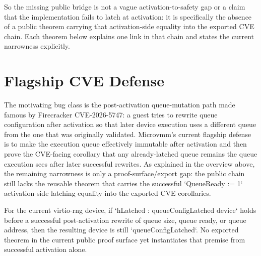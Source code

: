 So the missing public bridge is not a vague activation-to-safety gap or a claim that the implementation fails to latch at activation: it is specifically the absence of a public theorem carrying that activation-side equality into the exported CVE chain.
Each theorem below explains one link in that chain and states the current narrowness explicitly.

\section{Flagship CVE Defense}

The motivating bug class is the post-activation queue-mutation path made famous by Firecracker CVE-2026-5747: a guest tries to rewrite queue configuration after activation so that later device execution uses a different queue from the one that was originally validated.
Microvmm's current flagship defense is to make the execution queue effectively immutable after activation and then prove the CVE-facing corollary that any already-latched queue remains the queue execution sees after later successful rewrites.
As explained in the overview above, the remaining narrowness is only a proof-surface/export gap: the public chain still lacks the reusable theorem that carries the successful `QueueReady := 1` activation-side latching equality into the exported CVE corollaries.

\begin{theorem}
\label{thm:cve-latched-queue}
\leanok
For the current virtio-rng device, if `hLatched : queueConfigLatched device` holds before a successful post-activation rewrite of queue size, queue ready, or queue address, then the resulting device is still `queueConfigLatched`.
No exported theorem in the current public proof surface yet instantiates that premise from successful activation alone.
\end{theorem}

